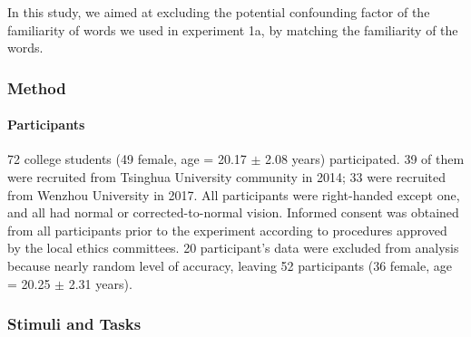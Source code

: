 \documentclass[
  english,
  man]{apa6}
\let\oldparagraph\paragraph
\renewcommand{\paragraph}[1]{\oldparagraph{#1}\mbox{}}
\begin{document}
In this study, we aimed at excluding the potential confounding factor of the familiarity of words we used in experiment 1a, by matching the familiarity of the words.

\hypertarget{method}{%
\subsubsection{Method}\label{method}}

\hypertarget{participants-1}{%
\paragraph{Participants}\label{participants-1}}

72 college students (49 female, age = 20.17 \(\pm\) 2.08 years) participated. 39 of them were recruited from Tsinghua University community in 2014; 33 were recruited from Wenzhou University in 2017. All participants were right-handed except one, and all had normal or corrected-to-normal vision. Informed consent was obtained from all participants prior to the experiment according to procedures approved by the local ethics committees. 20 participant's data were excluded from analysis because nearly random level of accuracy, leaving 52 participants (36 female, age = 20.25 \(\pm\) 2.31 years).

\hypertarget{stimuli-and-tasks-1}{%
\subsubsection{Stimuli and Tasks}\label{stimuli-and-tasks-1}}
\end{document}
